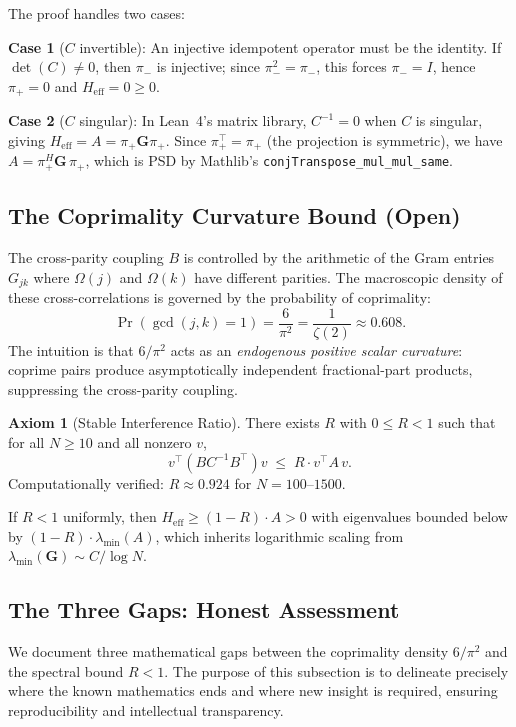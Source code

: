 \documentclass[11pt,a4paper]{article}
\theoremstyle{definition}
\newtheorem{axiombox}[theorem]{Axiom}
\theoremstyle{remark}
\newcommand{\Gram}{\mathbf{G}}
\newcommand{\lmin}{\lambda_{\min}}
\newcommand{\lean}[1]{\texttt{#1}}
\begin{document}
\noindent The proof handles two cases:

\smallskip\noindent\textbf{Case 1} ($C$ invertible):
An injective idempotent operator must be the identity.
If $\det(C) \neq 0$, then $\pi_-$ is injective; since $\pi_-^2 = \pi_-$,
this forces $\pi_- = I$, hence $\pi_+ = 0$ and $H_{\mathrm{eff}} = 0 \geq 0$.

\smallskip\noindent\textbf{Case 2} ($C$ singular):
In Lean~4's matrix library, $C^{-1} = 0$ when $C$ is singular,
giving $H_{\mathrm{eff}} = A = \pi_+ \Gram \pi_+$.
Since $\pi_+^\top = \pi_+$ (the projection is symmetric), we have
$A = \pi_+^H \Gram \, \pi_+$, which is PSD by Mathlib's
\lean{conjTranspose\_mul\_mul\_same}.

\subsection{The Coprimality Curvature Bound (Open)}

The cross-parity coupling $B$ is controlled by the arithmetic of
the Gram entries $G_{jk}$ where $\Omega(j)$ and $\Omega(k)$ have
different parities. The macroscopic density of these cross-correlations
is governed by the probability of coprimality:
\[
  \Pr(\gcd(j,k) = 1) = \frac{6}{\pi^2} = \frac{1}{\zeta(2)} \approx 0.608.
\]
The intuition is that $6/\pi^2$ acts as an \emph{endogenous positive
scalar curvature}: coprime pairs produce asymptotically independent
fractional-part products, suppressing the cross-parity coupling.

\begin{axiombox}[Stable Interference Ratio]
  There exists $R$ with $0 \leq R < 1$ such that for all $N \geq 10$
  and all nonzero $v$,
  \[
    v^\top (BC^{-1}B^\top) v \;\leq\; R \cdot v^\top A \, v.
  \]
  Computationally verified: $R \approx 0.924$ for $N = 100$--$1500$.
\end{axiombox}

\noindent If $R < 1$ uniformly, then $H_{\mathrm{eff}} \geq (1-R) \cdot A > 0$
with eigenvalues bounded below by $(1-R) \cdot \lmin(A)$, which
inherits logarithmic scaling from $\lmin(\Gram) \sim C/\log N$.

\subsection{The Three Gaps: Honest Assessment}\label{sec:gaps}

We document three mathematical gaps between the coprimality density
$6/\pi^2$ and the spectral bound $R < 1$. The purpose of this
subsection is to delineate precisely where the known mathematics
ends and where new insight is required, ensuring reproducibility
and intellectual transparency.
\end{document}
